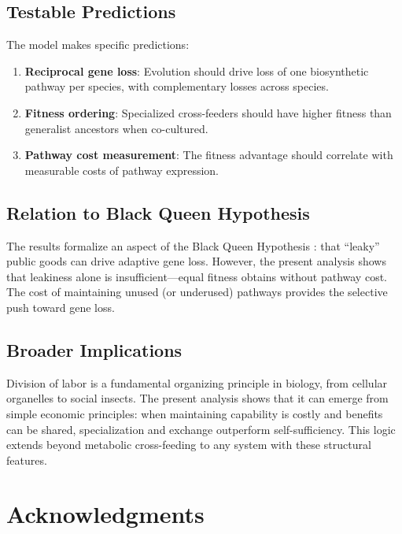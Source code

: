 \documentclass[11pt]{article}
\theoremstyle{definition}
\begin{document}
\subsection{Testable Predictions}

The model makes specific predictions:
\begin{enumerate}
\item \textbf{Reciprocal gene loss}: Evolution should drive loss of one biosynthetic pathway per species, with complementary losses across species.
\item \textbf{Fitness ordering}: Specialized cross-feeders should have higher fitness than generalist ancestors when co-cultured.
\item \textbf{Pathway cost measurement}: The fitness advantage should correlate with measurable costs of pathway expression.
\end{enumerate}

\subsection{Relation to Black Queen Hypothesis}

The results formalize an aspect of the Black Queen Hypothesis \citep{morris2012get}: that ``leaky'' public goods can drive adaptive gene loss. However, the present analysis shows that leakiness alone is insufficient---equal fitness obtains without pathway cost. The cost of maintaining unused (or underused) pathways provides the selective push toward gene loss.

\subsection{Broader Implications}

Division of labor is a fundamental organizing principle in biology, from cellular organelles to social insects. The present analysis shows that it can emerge from simple economic principles: when maintaining capability is costly and benefits can be shared, specialization and exchange outperform self-sufficiency. This logic extends beyond metabolic cross-feeding to any system with these structural features.

\section*{Acknowledgments}
\end{document}
